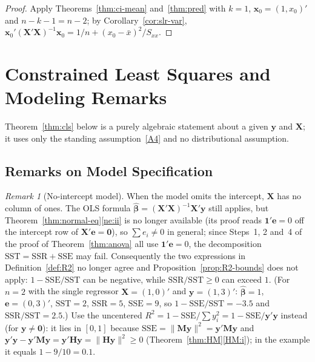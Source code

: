 \documentclass[14pt]{extarticle}
\theoremstyle{plain}
\theoremstyle{definition}
\theoremstyle{remark}
\newtheorem{remark}[theorem]{Remark}
\newcommand{\SST}{\mathrm{SST}}
\newcommand{\SSR}{\mathrm{SSR}}
\newcommand{\SSE}{\mathrm{SSE}}
\newcommand{\bX}{\mathbf{X}}
\newcommand{\by}{\mathbf{y}}
\newcommand{\bx}{\mathbf{x}}
\def\bb{\boldsymbol{\beta}}
\newcommand{\bH}{\mathbf{H}}
\newcommand{\bM}{\mathbf{M}}
\newcommand{\bone}{\mathbf{1}}
\newcommand{\bzero}{\mathbf{0}}
\begin{document}
\begin{proof}
Apply Theorems~\ref{thm:ci-mean} and~\ref{thm:pred} with $k = 1$, $\bx_0 = (1, x_0)'$ and $n - k - 1 = n - 2$; by Corollary~\ref{cor:slr-var}, $\bx_0'(\bX'\bX)^{-1}\bx_0 = 1/n + (x_0 - \bar x)^2/S_{xx}$.
\end{proof}

\section{Constrained Least Squares and Modeling Remarks}\label{sec:special}

Theorem~\ref{thm:cls} below is a purely algebraic statement about a given $\by$ and $\bX$; it uses only the standing assumption~\ref{A4} and no distributional assumption.

\subsection{Remarks on Model Specification}

\begin{remark}[No-intercept model]\label{rem:no-intercept}
When the model omits the intercept, $\bX$ has no column of ones. The OLS formula $\hat{\bb} = (\bX'\bX)^{-1}\bX'\by$ still applies, but Theorem~\ref{thm:normal-eq}\ref{ne:ii} is no longer available (its proof reads $\bone'\mathbf{e} = 0$ off the intercept row of $\bX'\mathbf{e} = \bzero$), so $\sum e_i \neq 0$ in general; since Steps~1, 2 and~4 of the proof of Theorem~\ref{thm:anova} all use $\bone'\mathbf{e} = 0$, the decomposition $\SST = \SSR + \SSE$ may fail. Consequently the two expressions in Definition~\ref{def:R2} no longer agree and Proposition~\ref{prop:R2-bounds} does not apply: $1 - \SSE/\SST$ can be negative, while $\SSR/\SST \geqslant 0$ can exceed $1$. (For $n = 2$ with the single regressor $\bX = (1, 0)'$ and $\by = (1, 3)'$: $\hat{\bb} = 1$, $\mathbf{e} = (0, 3)'$, $\SST = 2$, $\SSR = 5$, $\SSE = 9$, so $1 - \SSE/\SST = -3.5$ and $\SSR/\SST = 2.5$.) Use the uncentered $R^2 = 1 - \SSE/\sum y_i^2 = 1 - \SSE/\by'\by$ instead (for $\by \neq \bzero$): it lies in $[0, 1]$ because $\SSE = \|\bM\by\|^2 = \by'\bM\by$ and $\by'\by - \by'\bM\by = \by'\bH\by = \|\bH\by\|^2 \geqslant 0$ (Theorem~\ref{thm:HM}\ref{HM:i}); in the example it equals $1 - 9/10 = 0.1$.
\end{remark}
\end{document}
